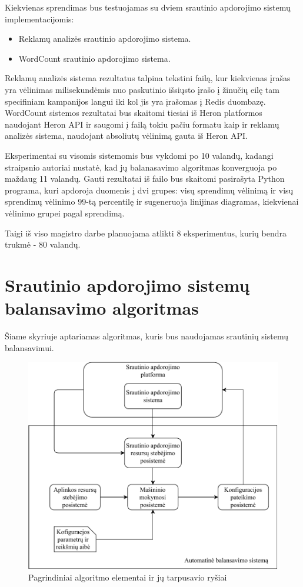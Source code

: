 \documentclass{VUMIFPSbakalaurinis}
\begin{document}
Kiekvienas sprendimas bus testuojamas su dviem srautinio apdorojimo sistemų implementacijomis:
\begin{itemize}
    \item Reklamų analizės srautinio apdorojimo sistema.
    \item WordCount srautinio apdorojimo sistema.
\end{itemize}

Reklamų analizės sistema rezultatus talpina tekstini failą, kur kiekvienas įrašas yra vėlinimas milisekundėmis nuo paskutinio išsiųsto įrašo į žinučių eilę tam specifiniam kampanijos langui iki kol jis yra įrašomas į Redis duombazę. WordCount sistemos rezultatai bus skaitomi tiesiai iš Heron platformos naudojant Heron API ir saugomi į failą tokiu pačiu formatu kaip ir reklamų analizės sistema, naudojant absoliutų vėlinimą gauta iš Heron API. 

Eksperimentai su visomis sistemomis bus vykdomi po 10 valandų, kadangi \cite{vaquero2018autotuning} straipsnio autoriai nustatė, kad jų balanasavimo algoritmas konverguoja po maždaug 11 valandų. 
Gauti rezultatai iš failo bus skaitomi pasirašyta Python programa, kuri apdoroja duomenis į dvi grupes: visų sprendimų vėlinimą ir visų sprendimų vėlinimo 99-tą percentilę ir sugeneruoja linijinas diagramas, kiekvienai vėlinimo grupei pagal sprendimą.

Taigi iš viso magistro darbe planuojama atlikti 8 eksperimentus, kurių bendra trukmė - 80 valandų.

\section{Srautinio apdorojimo sistemų balansavimo algoritmas}
Šiame skyriuje aptariamas algoritmas, kuris bus naudojamas srautinių sistemų balansavimui. 
\begin{figure}[H]
    \includegraphics[width=15cm]{img/BalansavimoDiagrama.pdf}
    \caption{Pagrindiniai algoritmo elementai ir jų tarpusavio ryšiai}
    \label{balansavimo_sistema}
\end{figure} 
\end{document}
